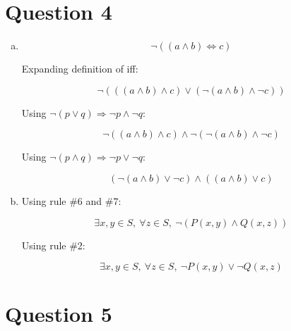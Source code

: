 \documentclass[12pt]{article}
\begin{document}
\section*{Question 4}
    \begin{enumerate}[a)]
        \item
        \begin{equation}
            \neg ((a \land b) \Leftrightarrow c)
        \end{equation}

        Expanding definition of iff:

        \begin{equation}
            \neg (((a\land b) \land c) \lor (\neg (a \land b) \land \neg c))
        \end{equation}

        Using $\neg(p \lor q) \Rightarrow \neg p \land \neg q$:

        \begin{equation}
            \neg((a\land b) \land c) \land \neg (\neg (a \land b) \land \neg c)
        \end{equation}

        Using $\neg(p \land q) \Rightarrow \neg p \lor \neg q$:

        \begin{equation}
            (\neg(a\land b) \lor \neg c) \land ((a \land b) \lor c)
        \end{equation}

        \item
        Using rule \#6 and \#7:

        \begin{equation}
            \exists x,y \in S,\: \forall z \in S,\:\neg (P(x,y) \land Q(x,z))
        \end{equation}

        Using rule \#2:

        \begin{equation}
            \exists x,y \in S,\: \forall z \in S,\:\neg P(x,y) \lor \neg Q(x,z)
        \end{equation}

    \end{enumerate}

\section*{Question 5}
\end{document}
